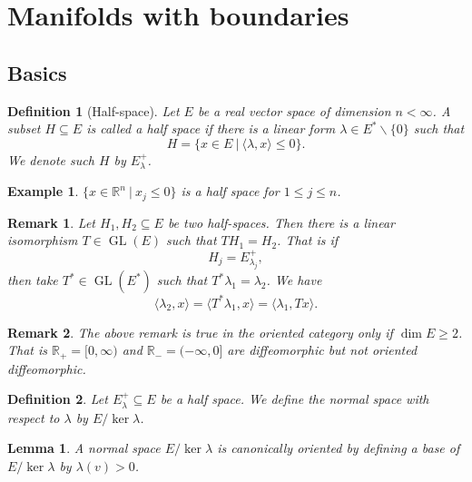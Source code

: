 \documentclass[8pt]{article}
\newtheorem{definition}{Definition}[section]
\newtheorem{lemma}{Lemma}[section]
\newtheorem{remark}{Remark}[section]
\newtheorem{example}{Example}[section]
\DeclareMathOperator{\GL}{GL}
\newcommand{\R}[0]{\mathbb{R}}
\newcommand{\sep}[0]{\:|\:}
\begin{document}
\section{Manifolds with boundaries}

\subsection{Basics}

\begin{definition}[Half-space]
  Let $E$ be a real vector space of dimension $n<\infty$. A subset $H\subseteq E$ is called a half space if there is a linear form $\lambda\in E^*\backslash\{0\}$ such that
  \begin{equation*}
    H = \{x\in E\sep \langle\lambda,x\rangle\leq0\}.
  \end{equation*}
  We denote such $H$ by $E_\lambda^+$.
\end{definition}

\begin{example}
  $\{x\in\R^n\sep x_j\leq 0\}$ is a half space for $1\leq j\leq n$.
\end{example}

\begin{remark}
  Let $H_1,H_2\subseteq E$ be two half-spaces.  Then there is a linear isomorphism $T\in\GL(E)$ such that $TH_1=H_2$. That is if 
  \begin{equation*}
    H_j = E_{\lambda_j}^+,
  \end{equation*}
  then take $T^*\in\GL(E^*)$ such that $T^*\lambda_1 = \lambda_2$. We have 
  \begin{equation*}
    \langle \lambda_2,x\rangle = \langle T^*\lambda_1,x\rangle = \langle \lambda_1,Tx\rangle.
  \end{equation*}
\end{remark}

\begin{remark}
  The above remark is true in the oriented category only if $\dim E\geq 2$. That is $\R_+=[0,\infty)$ and $\R_-=(-\infty,0]$ are diffeomorphic but not oriented diffeomorphic.
\end{remark}

\begin{definition}
  Let $E_\lambda^+\subseteq E$ be a half space. We define the normal space with respect to $\lambda$ by $E/\ker\lambda$.
\end{definition}

\begin{lemma}
  A normal space $E/\ker\lambda$ is canonically oriented by defining a base of $E/\ker\lambda$ by $\lambda(v)>0$.
\end{lemma}
\end{document}

